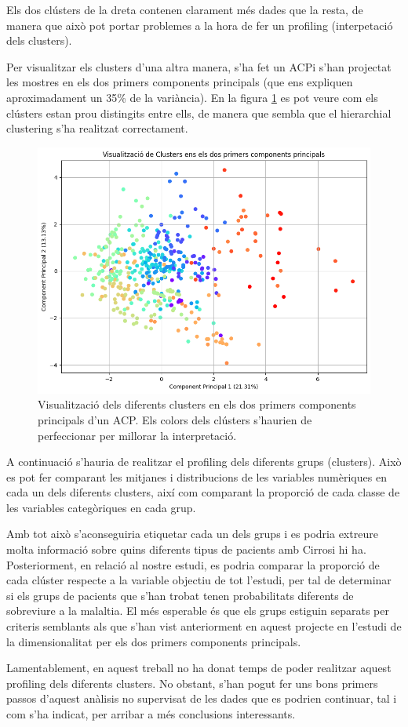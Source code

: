 Els dos clústers de la dreta contenen clarament més dades que la resta, de manera que això pot portar problemes a la hora de fer un profiling (interpetació dels clusters).

Per visualitzar els clusters d'una altra manera, s'ha fet un ACPi s'han projectat les mostres en els dos primers components principals (que ens expliquen aproximadament un 35\% de la variància). En la figura \ref{fig:clust-acp} es pot veure com els clústers estan prou distingits entre ells, de manera que sembla que el hierarchial clustering s'ha realitzat correctament.

\begin{figure}[H]
	\centering
	\includegraphics[width=0.85\linewidth]{img/clust-acp.png}
	\caption{Visualització dels diferents clusters en els dos primers components principals d'un ACP. Els colors dels clústers s'haurien de perfeccionar per millorar la interpretació.}
	\label{fig:clust-acp}
\end{figure}

A continuació s'hauria de realitzar el profiling dels diferents grups (clusters). Això es pot fer comparant les mitjanes i distribucions de les variables numèriques en cada un dels diferents clusters, així com comparant la proporció de cada classe de les variables categòriques en cada grup.

Amb tot això s'aconseguiria etiquetar cada un dels grups i es podria extreure molta informació sobre quins diferents tipus de pacients amb Cirrosi hi ha. Posteriorment, en relació al nostre estudi, es podria comparar la proporció de cada clúster respecte a la variable objectiu de tot l'estudi, per tal de determinar si els grups de pacients que s'han trobat tenen probabilitats diferents de sobreviure a la malaltia. El més esperable és que els grups estiguin separats per criteris semblants als que s'han vist anteriorment en aquest projecte en l'estudi de la dimensionalitat per els dos primers components principals.

Lamentablement, en aquest treball no ha donat temps de poder realitzar aquest profiling dels diferents clusters. No obstant, s'han pogut fer uns bons primers passos d'aquest anàlisis no supervisat de les dades que es podrien continuar, tal i com s'ha indicat, per arribar a més conclusions interessants.